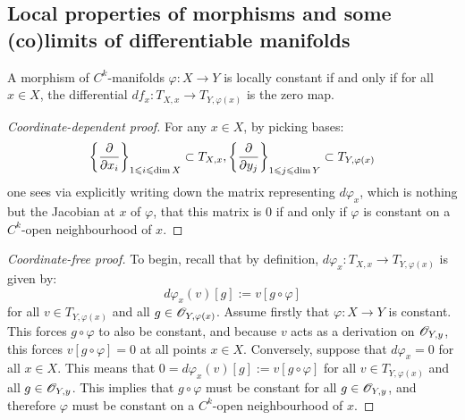     \subsection{Local properties of morphisms and some (co)limits of differentiable manifolds}
        \begin{lemma} \label{lemma: locally_constant_morphisms}
            A morphism of $C^k$-manifolds $\varphi: X \to Y$ is locally constant if and only if for all $x \in X$, the differential $df_x: T_{X, x} \to T_{Y, \varphi(x)}$ is the zero map.
        \end{lemma}
            \begin{proof}[Coordinate-dependent proof]
                For any $x \in X$, by picking bases:
                    $$\left\{ \frac{\partial}{\partial x_i} \right\}_{1 \leqslant i \leqslant \dim X} \subset T_{X, x}, \left\{ \frac{\partial}{\partial y_j} \right\}_{1 \leqslant j \leqslant \dim Y} \subset T_{Y, \varphi(x)}$$
                one sees via explicitly writing down the matrix representing $d\varphi_x$, which is nothing but the Jacobian at $x$ of $\varphi$, that this matrix is $0$ if and only if $\varphi$ is constant on a $C^k$-open neighbourhood of $x$.
            \end{proof}
            \begin{proof}[Coordinate-free proof]
                To begin, recall that by definition, $d\varphi_x: T_{X, x} \to T_{Y, \varphi(x)}$ is given by:
                    $$d\varphi_x(v)[g] := v[g \circ \varphi]$$
                for all $v \in T_{Y, \varphi(x)}$ and all $g \in \mathscr{O}_{Y, \varphi(x)}$. Assume firstly that $\varphi: X \to Y$ is constant. This forces $g \circ \varphi$ to also be constant, and because $v$ acts as a derivation on $\mathscr{O}_{Y, y}$, this forces $v[g \circ \varphi] = 0$ at all points $x \in X$. Conversely, suppose that $d\varphi_x = 0$ for all $x \in X$. This means that $0 = d\varphi_x(v)[g] := v[g \circ \varphi]$ for all $v \in T_{Y, \varphi(x)}$ and all $g \in \mathscr{O}_{Y, y}$. This implies that $g \circ \varphi$ must be constant for all $g \in \mathscr{O}_{Y, y}$, and therefore $\varphi$ must be constant on a $C^k$-open neighbourhood of $x$.  
            \end{proof}
    
